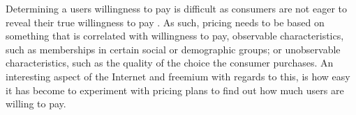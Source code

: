 Determining a users willingness to pay is difficult as consumers are not eager to reveal their true willingness to pay \citep{varian1995}. As such, pricing needs to be based on something that is correlated with willingness to pay, \eg observable characteristics, such as memberships in certain social or demographic groups; or unobservable characteristics, such as the quality of the choice the consumer purchases. An interesting aspect of the Internet and freemium with regards to this, is how easy it has become to experiment with pricing plans to find out how much users are willing to pay.



